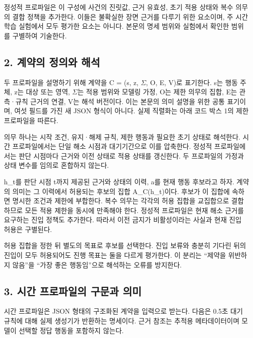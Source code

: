 \documentclass[11pt,a4paper]{article}
\begin{document}
정성적 프로파일은 이 구성에 사건의 진릿값, 근거 유효성, 초기 적용 상태와 복수 의무의 결합 정책을 추가한다. 이들은 불확실한 장면 근거를 다루기 위한 요소이며, 주 시간 학습 실험에서 모두 평가한 요소는 아니다. 본문의 명세 범위와 실험에서 확인한 범위를 구별하여 기술한다.\par

\subsection*{2. 계약의 정의와 해석}

두 프로파일을 설명하기 위해 계약을 {\ttfamily\small C = (s, z, \ensuremath{\Sigma}, O, E, V)}로 표기한다. s는 행동 주체, z는 대상 또는 영역, \ensuremath{\Sigma}는 적용 범위와 모델링 가정, O는 제한 의무의 집합, E는 관측·규칙 근거의 연결, V는 해석 버전이다. 이는 본문의 의미 설명을 위한 공통 표기이며, 여섯 필드를 가진 새 JSON 형식이 아니다. 실제 직렬화는 아래 코드 박스 1의 제한 프로파일을 따른다.\par

의무 하나는 시작 조건, 유지·해제 규칙, 제한 행동과 필요한 초기 상태로 해석한다. 시간 프로파일에서는 단일 해소 시점과 대기기간으로 이를 압축한다. 정성적 프로파일에서는 판단 시점마다 근거와 이전 상태로 적용 상태를 갱신한다. 두 프로파일의 가정과 상태 변수를 임의로 혼합하지 않는다.\par

h\_t를 판단 시점 t까지 제공된 근거와 상태의 이력, a를 현재 행동 후보라고 하자. 계약의 의미는 그 이력에서 허용되는 후보의 집합 {\ttfamily\small A\_C(h\_t)}이다. 후보가 이 집합에 속하면 명시한 조건과 제한에 부합한다. 복수 의무는 각각의 허용 집합을 교집합으로 결합하므로 모든 적용 제한을 동시에 만족해야 한다. 정성적 프로파일은 현재 해소 근거를 요구하는 진입 정책도 추가한다. 따라서 이전 금지가 비활성이라는 사실과 현재 진입 허용은 구별된다.\par

허용 집합을 정한 뒤 별도의 목표로 후보를 선택한다. 진입 보류와 충분히 기다린 뒤의 진입이 모두 허용되어도 진행 목표는 둘을 다르게 평가한다. 이 분리는 “제약을 위반하지 않음”을 “가장 좋은 행동임”으로 해석하는 오류를 방지한다.\par

\subsection*{3. 시간 프로파일의 구문과 의미}

시간 프로파일은 JSON 형태의 구조화된 계약을 입력으로 받는다. 다음은 0.5초 대기 규칙에 대해 실제 생성기가 반환하는 명세이다. 근거 참조는 추적용 메타데이터이며 모델이 선택할 정답 행동을 포함하지 않는다.\par
\end{document}
